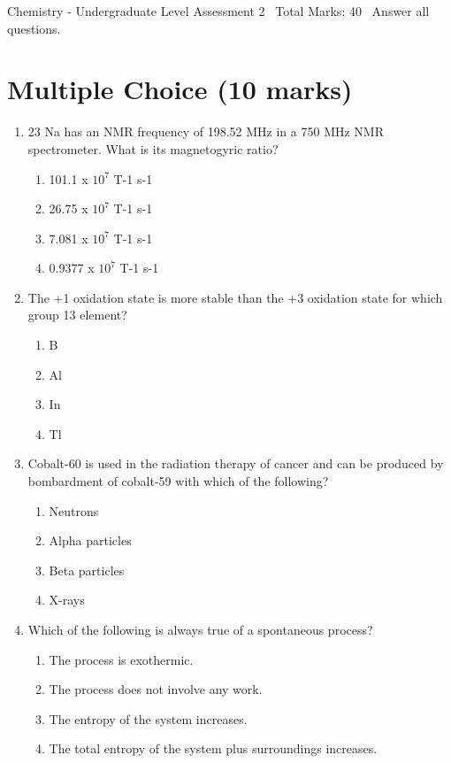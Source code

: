 \documentclass[12pt]{article}
\begin{document}
\begin{center}
Chemistry - Undergraduate Level Assessment 2 \
Total Marks: 40 \
Answer all questions.
\end{center}

\section*{Multiple Choice (10 marks)}
\begin{enumerate}[label=\arabic*.]
\item 23 Na has an NMR frequency of 198.52 MHz in a 750 MHz NMR spectrometer. What is its magnetogyric ratio?
\begin{enumerate}[label=(\alph*)]
    \item 101.1 x $10^7$ T-1 s-1
    \item 26.75 x $10^7$ T-1 s-1
    \item 7.081 x $10^7$ T-1 s-1
    \item 0.9377 x $10^7$ T-1 s-1
\end{enumerate}
\item The +1 oxidation state is more stable than the +3 oxidation state for which group 13 element?
\begin{enumerate}[label=(\alph*)]
    \item B
    \item Al
    \item In
    \item Tl
\end{enumerate}
\item Cobalt-60 is used in the radiation therapy of cancer and can be produced by bombardment of cobalt-59 with which of the following?
\begin{enumerate}[label=(\alph*)]
    \item Neutrons
    \item Alpha particles
    \item Beta particles
    \item X-rays
\end{enumerate}
\item Which of the following is always true of a spontaneous process?
\begin{enumerate}[label=(\alph*)]
    \item The process is exothermic.
    \item The process does not involve any work.
    \item The entropy of the system increases.
    \item The total entropy of the system plus surroundings increases.

\end{enumerate}
\end{enumerate}
\end{document}
